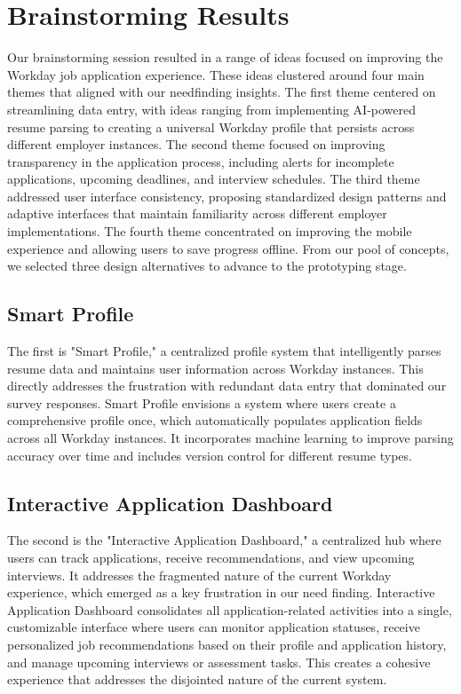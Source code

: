 \documentclass[
	letterpaper, %
]{jdf}
\begin{document}
\hfill \break
\newpage
\section{Brainstorming Results}
Our brainstorming session resulted in a range of ideas focused on improving the Workday job application experience. These ideas clustered around four main themes that aligned with our needfinding insights. The first theme centered on streamlining data entry, with ideas ranging from implementing AI-powered resume parsing to creating a universal Workday profile that persists across different employer instances. The second theme focused on improving transparency in the application process, including alerts for incomplete applications, upcoming deadlines, and interview schedules. The third theme addressed user interface consistency, proposing standardized design patterns and adaptive interfaces that maintain familiarity across different employer implementations. The fourth theme concentrated on improving the mobile experience and allowing users to save progress offline. From our pool of concepts, we selected three design alternatives to advance to the prototyping stage.

\subsection{Smart Profile}
The first is "Smart Profile," a centralized profile system that intelligently parses resume data and maintains user information across Workday instances. This directly addresses the frustration with redundant data entry that dominated our survey responses. Smart Profile envisions a system where users create a comprehensive profile once, which automatically populates application fields across all Workday instances. It incorporates machine learning to improve parsing accuracy over time and includes version control for different resume types. 

\subsection{Interactive Application Dashboard}
The second is the "Interactive Application Dashboard," a centralized hub where users can track applications, receive recommendations, and view upcoming interviews. It addresses the fragmented nature of the current Workday experience, which emerged as a key frustration in our need finding. Interactive Application Dashboard consolidates all application-related activities into a single, customizable interface where users can monitor application statuses, receive personalized job recommendations based on their profile and application history, and manage upcoming interviews or assessment tasks. This creates a cohesive experience that addresses the disjointed nature of the current system.
\end{document}
